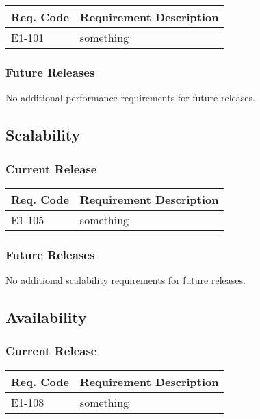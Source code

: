 \documentclass[12pt]{article}
\begin{document}
\begin{table}[!h]
	\begin{tabular}{| l | l |}
		\hline
		\textbf{Req. Code} & \textbf{Requirement Description}\\
		\hline
		E1-101	& something\\
		\hline
	\end{tabular}
	\label{tab:PerformanceRequirements}
\end{table}

\subsubsection{Future Releases}
No additional performance requirements for future releases.


\subsection{Scalability}

\subsubsection{Current Release}

\begin{table}[!h]
	\begin{tabular}{| l | l |}
		\hline
		\textbf{Req. Code} & \textbf{Requirement Description}\\
		\hline
		E1-105	& something\\
		\hline
	\end{tabular}
	\label{tab:ScalabilityRequirements}
\end{table}

\subsubsection{Future Releases}
No additional scalability requirements for future releases.


\subsection{Availability}

\subsubsection{Current Release}

\begin{table}[!h]
	\begin{tabular}{| l | l |}
		\hline
		\textbf{Req. Code} & \textbf{Requirement Description}\\
		\hline
		E1-108	& something\\
		\hline
	\end{tabular}
	\label{tab:AvailabilityRequirements}
\end{table}
\end{document}

